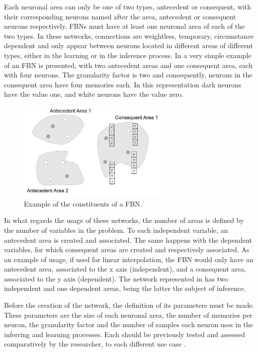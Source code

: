 Each neuronal area can only be one of two types, antecedent or consequent, with their corresponding neurons named after the area, antecedent or consequent neurons respectively. FBNs must have at least one neuronal area of each of the two types. In these networks, connections are weightless, temporary, circumstance dependent and only appear between neurons located in different areas of different types, either in the learning or in the inference process.
In  a very simple example of an FBN is presented, with  two antecedent areas and one consequent area, each with four neurons. The granularity factor is two and consequently, neurons in the consequent area have four memories each. In this representation dark neurons have the value one, and white neurons have the value zero.

\begin{figure}[ht]
\centering
\includegraphics[width=0.65\textwidth]{./Images/fbn-drawing.jpg}
\caption{Example of the constituents of a FBN.}
\label{fig:fbn-drawing}
\end{figure}

In what regards the usage of these networks, the number of areas is defined by the number of variables in the problem. To each independent variable, an antecedent area is created and associated. The same happens with the dependent variables, for which consequent areas are created and respectively associated. As an example of usage, if used for linear interpolation, the FBN would only have an antecedent area, associated to the x axis (independent), and a consequent area, associated to the y axis (dependent). The network represented in  has two independent and one dependent areas, being the latter the subject of inference.

Before the creation of the network, the definition of its parameters must be made. These parameters are the size of each neuronal area, the number of memories per neuron, the granularity factor and the number of samples each neuron uses in the inferring and learning processes. Each should be previously tested and assessed comparatively by the researcher, to each different use case \cite{Tome2014}.

